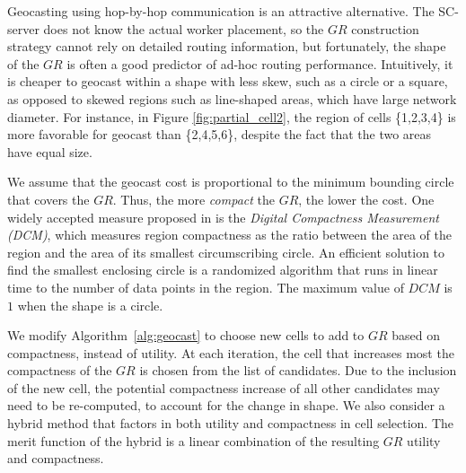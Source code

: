 \documentclass{USC-Thesis}
\numberwithin{equation}{chapter}
\begin{document}
Geocasting using hop-by-hop communication is an attractive alternative. The SC-server does not know the actual worker placement, so the $\mathit{GR}$ construction strategy cannot rely on detailed routing information, but fortunately, the shape of the $\mathit{GR}$ is often a good predictor of ad-hoc routing performance. Intuitively, it is cheaper to geocast within a shape with less skew, such as a circle or a square, as opposed to skewed regions such as line-shaped areas, which have large network diameter. For instance, in Figure \ref{fig:partial_cell2}, the region of cells \{1,2,3,4\} is more favorable for geocast than \{2,4,5,6\}, despite the fact that the two areas have equal size. 

We assume that the geocast cost is proportional to the minimum bounding circle that covers the $\mathit{GR}$. Thus, the more {\em compact} the $\mathit{GR}$, the lower the cost.
One widely accepted measure proposed in \cite{kim1984digital}    is the {\em Digital Compactness Measurement (DCM)}, which measures region compactness as the ratio between the area of the region and the area of its smallest circumscribing circle. An efficient solution to find the smallest enclosing circle is a randomized algorithm \cite{welzl1991smallest} that runs in linear time to the number of data points in the region. The maximum value of $\mathit{DCM}$ is $1$ when the shape is a circle.

We modify Algorithm~\ref{alg:geocast} to choose new cells to add to $\mathit{GR}$ based on compactness, instead of utility. At each iteration, the cell that increases most the compactness of the $\mathit{GR}$ is chosen from the list of candidates. Due to the inclusion of the new cell, the potential compactness increase of all other candidates may need to be re-computed, to account for the change in shape. 
We also consider a hybrid method that factors in both utility and compactness in cell selection. The merit function of the hybrid is a linear combination of the resulting $\mathit{GR}$ utility and compactness. 
\end{document}
